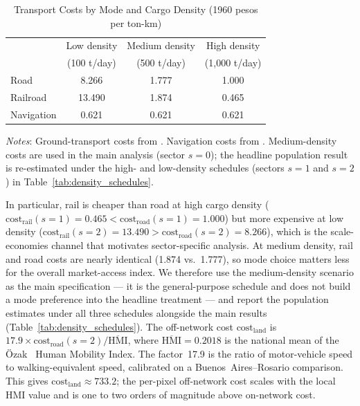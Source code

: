 \begin{table}[htbp]
\centering
\small
\caption{Transport Costs by Mode and Cargo Density
         (1960 pesos per ton-km)}
\label{tab:cost_params}
\begin{tabular}{lccc}
\toprule
              & Low density  & Medium density & High density \\
              & (100 t/day)  & (500 t/day)    & (1{,}000 t/day) \\
\midrule
Road          & 8.266        & 1.777          & 1.000 \\
Railroad      & 13.490       & 1.874          & 0.465 \\
Navigation    & 0.621        & 0.621          & 0.621 \\
\bottomrule
\end{tabular}

\vspace{0.5em}
{\footnotesize
\begin{minipage}{0.85\textwidth}
\emph{Notes}: Ground-transport costs from
\citet{baumgartnerpalazzo1969}. Navigation costs from
\citet{larkin1962}. Medium-density costs are used in the main
analysis (sector $s = 0$); the headline population result is
re-estimated under the high- and low-density schedules (sectors
$s = 1$ and $s = 2$) in Table~\ref{tab:density_schedules}.
\end{minipage}
}
\end{table}

In particular, rail is cheaper than road at high cargo density
($\text{cost}_\mathrm{rail}(s{=}1) = 0.465 <
\text{cost}_\mathrm{road}(s{=}1) = 1.000$) but more expensive at low
density ($\text{cost}_\mathrm{rail}(s{=}2) = 13.490 >
\text{cost}_\mathrm{road}(s{=}2) = 8.266$), which is the
scale-economies channel that motivates sector-specific analysis. At
medium density, rail and road costs are nearly identical (1.874 vs.\
1.777), so mode choice matters less for the overall market-access
index. We therefore use the medium-density scenario as the main
specification --- it is the general-purpose schedule and does not
build a mode preference into the headline treatment --- and report
the population estimates under all three schedules alongside the
main results (Table~\ref{tab:density_schedules}). The
off-network cost $\text{cost}_{\mathrm{land}}$ is
$17.9 \times \text{cost}_\mathrm{road}(s{=}2) / \overline{\mathrm{HMI}}$,
where $\overline{\mathrm{HMI}} = 0.2018$ is the national mean of the
Özak~\citeyearpar{ozak2018} Human Mobility Index. The factor~17.9 is
the ratio of motor-vehicle speed to walking-equivalent speed, calibrated
on a Buenos~Aires--Rosario comparison. This gives
$\text{cost}_{\mathrm{land}} \approx 733.2$; the per-pixel off-network
cost scales with the local HMI value and is one to two orders of
magnitude above on-network cost.

